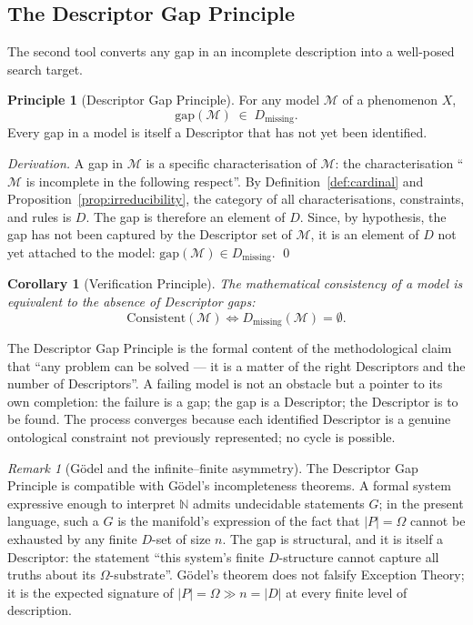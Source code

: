\documentclass[11pt,a4paper]{article}
\newtheorem{corollary}[theorem]{Corollary}
\theoremstyle{definition}
\newtheorem{principle}[theorem]{Principle}
\theoremstyle{remark}
\newtheorem{remark}[theorem]{Remark}
\begin{document}
\subsection{The Descriptor Gap Principle}\label{subsec:descriptor-gap}

The second tool converts any gap in an incomplete description into a well-posed search target.

\begin{principle}[Descriptor Gap Principle]\label{princ:descriptor-gap}
For any model $\mathcal{M}$ of a phenomenon $X$,
\[
\boxed{\;\mathrm{gap}(\mathcal{M}) \;\in\; D_{\mathrm{missing}}.\;}
\]
Every gap in a model is itself a Descriptor that has not yet been identified.
\end{principle}

\begin{proof}[Derivation]
A gap in $\mathcal{M}$ is a specific characterisation of $\mathcal{M}$: the characterisation ``$\mathcal{M}$ is incomplete in the following respect''. By Definition~\ref{def:cardinal} and Proposition~\ref{prop:irreducibility}, the category of all characterisations, constraints, and rules is $D$. The gap is therefore an element of $D$. Since, by hypothesis, the gap has not been captured by the Descriptor set of $\mathcal{M}$, it is an element of $D$ not yet attached to the model: $\mathrm{gap}(\mathcal{M})\in D_{\mathrm{missing}}$. \qed
\end{proof}

\begin{corollary}[Verification Principle]\label{cor:verification}
The mathematical consistency of a model is equivalent to the absence of Descriptor gaps:
\[
\mathrm{Consistent}(\mathcal{M}) \iff D_{\mathrm{missing}}(\mathcal{M}) = \emptyset.
\]
\end{corollary}

The Descriptor Gap Principle is the formal content of the methodological claim that ``any problem can be solved --- it is a matter of the right Descriptors and the number of Descriptors''. A failing model is not an obstacle but a pointer to its own completion: the failure is a gap; the gap is a Descriptor; the Descriptor is to be found. The process converges because each identified Descriptor is a genuine ontological constraint not previously represented; no cycle is possible.

\begin{remark}[Gödel and the infinite--finite asymmetry]\label{rem:godel-asymmetry}
The Descriptor Gap Principle is compatible with Gödel's incompleteness theorems. A formal system expressive enough to interpret $\mathbb{N}$ admits undecidable statements $G$; in the present language, such a $G$ is the manifold's expression of the fact that $|P|=\Omega$ cannot be exhausted by any finite $D$-set of size $n$. The gap is structural, and it is itself a Descriptor: the statement ``this system's finite $D$-structure cannot capture all truths about its $\Omega$-substrate''. Gödel's theorem does not falsify Exception Theory; it is the expected signature of $|P|=\Omega \gg n = |D|$ at every finite level of description.
\end{remark}
\end{document}
